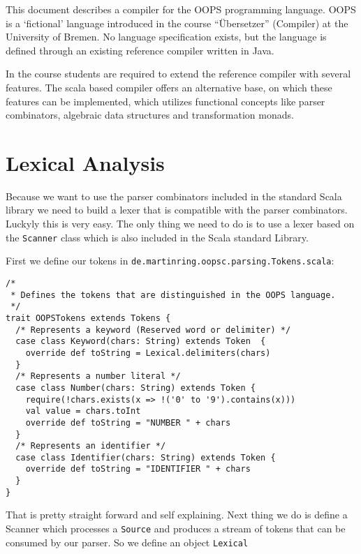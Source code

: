 \documentclass{style}
\begin{document}
\maketitle


This document describes a compiler for the OOPS programming language. OOPS is a `fictional' language introduced in the course ``Übersetzer'' (Compiler) at the University of Bremen. No language specification exists, but the language is defined through an existing reference compiler written in Java.

In the course students are required to extend the reference compiler with several features. The scala based compiler offers an alternative base, on which these features can be implemented, which utilizes functional concepts like parser combinators, algebraic data structures and transformation monads.      
 
\section{Lexical Analysis}

Because we want to use the parser combinators included in the standard Scala library we need to build a lexer that is compatible with the parser combinators. Luckyly this is very easy. The only thing we need to do is to use a lexer based on the \texttt{Scanner} class which is also included in the Scala standard Library. 

First we define our tokens in \texttt{de.martinring.oopsc.parsing.Tokens.scala}:

\begin{lstlisting}[name=tokens]
/*
 * Defines the tokens that are distinguished in the OOPS language.
 */
trait OOPSTokens extends Tokens {
  /* Represents a keyword (Reserved word or delimiter) */
  case class Keyword(chars: String) extends Token  {
    override def toString = Lexical.delimiters(chars)
  }
  /* Represents a number literal */
  case class Number(chars: String) extends Token {
    require(!chars.exists(x => !('0' to '9').contains(x)))
    val value = chars.toInt
    override def toString = "NUMBER " + chars
  }
  /* Represents an identifier */
  case class Identifier(chars: String) extends Token {
    override def toString = "IDENTIFIER " + chars
  }
}
\end{lstlisting}

That is pretty straight forward and self explaining. Next thing we do is define a Scanner which processes a \texttt{Source} and produces a stream of tokens that can be consumed by our parser. So we define an object \texttt{Lexical}
\end{document}
